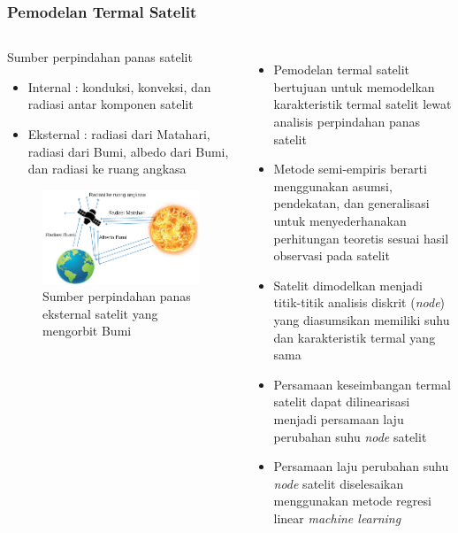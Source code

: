 \documentclass[8pt]{beamer}
\begin{document}
\begin{frame}
  \frametitle{Pemodelan Termal Satelit}
  \begin{columns}[T]
    \begin{block}{\center Sumber perpindahan panas satelit}
      \begin{itemize}
        \item Internal : konduksi, konveksi, dan radiasi antar komponen satelit
        \item Eksternal : radiasi dari Matahari, radiasi dari Bumi, albedo dari Bumi, dan radiasi ke ruang angkasa
      \end{itemize}
      \begin{figure}
        \includegraphics[width=1.0\textwidth]{figure/external_source.png}
        Sumber perpindahan panas eksternal satelit yang mengorbit Bumi \cite{abdelkhalek2019}
      \end{figure}
    \end{block}
    \begin{itemize}
      \item Pemodelan termal satelit bertujuan untuk memodelkan karakteristik termal satelit lewat analisis perpindahan panas satelit
      \item Metode semi-empiris berarti menggunakan asumsi, pendekatan, dan generalisasi untuk menyederhanakan perhitungan teoretis sesuai hasil observasi pada satelit
      \item Satelit dimodelkan menjadi titik-titik analisis diskrit (\textit{node}) yang diasumsikan memiliki suhu dan karakteristik termal yang sama
      \item Persamaan keseimbangan termal satelit dapat dilinearisasi menjadi persamaan laju perubahan suhu \textit{node} satelit
      \item Persamaan laju perubahan suhu \textit{node} satelit diselesaikan menggunakan metode regresi linear \textit{machine learning}
    \end{itemize}
  \end{columns}
\end{frame}
\end{document}
